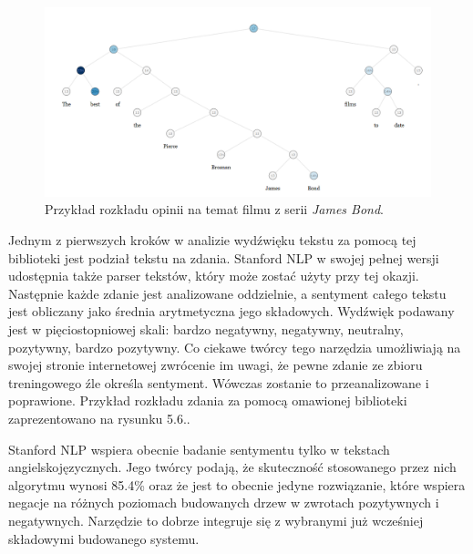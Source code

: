 \begin{figure}[h] %
	\centering
	\includegraphics[width=1.0\linewidth]{img/nlp_stanford_nlp_bond}
	\caption{Przykład rozkładu opinii na temat filmu z serii \textit{James Bond}.}
\end{figure}

Jednym z pierwszych kroków w analizie wydźwięku tekstu za pomocą tej biblioteki jest podział tekstu na zdania. Stanford NLP w swojej pełnej wersji udostępnia także parser tekstów, który może zostać użyty przy tej okazji. Następnie każde zdanie jest analizowane oddzielnie, a sentyment całego tekstu jest obliczany jako średnia arytmetyczna jego składowych. Wydźwięk podawany jest w pięciostopniowej skali: bardzo negatywny, negatywny, neutralny, pozytywny, bardzo pozytywny. Co ciekawe twórcy tego narzędzia umożliwiają na swojej stronie internetowej zwrócenie im uwagi, że pewne zdanie ze zbioru treningowego źle określa sentyment. Wówczas zostanie to przeanalizowane i poprawione. Przykład rozkładu zdania za pomocą omawionej biblioteki zaprezentowano na rysunku 5.6..

Stanford NLP wspiera obecnie badanie sentymentu tylko w tekstach angielskojęzycznych. Jego twórcy podają, że skuteczność stosowanego przez nich algorytmu wynosi 85.4\% oraz że jest to obecnie jedyne rozwiązanie, które wspiera negacje na różnych poziomach budowanych drzew w zwrotach pozytywnych i negatywnych. Narzędzie to dobrze integruje się z wybranymi już wcześniej składowymi budowanego systemu.